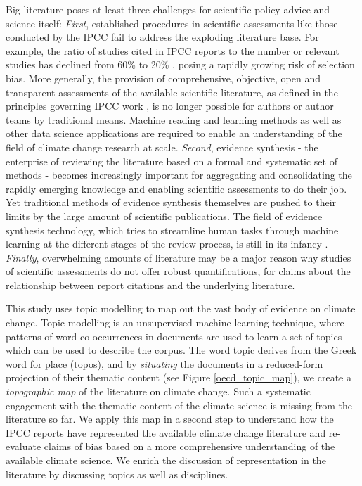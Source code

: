 \documentclass{article}
\begin{document}
\begin{linenumbers}
		Big literature poses at least three challenges for scientific policy advice and science itself: \emph{First}, established procedures in scientific assessments like those conducted by the IPCC fail to address the exploding literature base. For example, the ratio of studies cited in IPCC reports to the number or relevant studies has declined from 60\% to 20\%  \cite{Minx2017l}, posing a rapidly growing risk of selection bias. More generally, the provision of comprehensive, objective, open and transparent assessments of the available scientific literature, as defined in the principles governing IPCC work \cite{IPCC2013}, is no longer possible for authors or author teams by traditional means. 
		Machine reading and learning methods as well as other data science applications are required to enable an understanding of the field of climate change research at scale. 
		\emph{Second}, evidence synthesis - the enterprise of reviewing the literature based on a formal and systematic set of methods \cite{Chalmers2002} - becomes increasingly important for aggregating and consolidating the rapidly emerging knowledge and enabling scientific assessments to do their job. 
		Yet traditional methods of evidence synthesis themselves are pushed to their limits by the large amount of scientific publications. The field of evidence synthesis technology, which tries to streamline human tasks through machine learning at the different stages of the review process, is still in its infancy \cite{Beller2018}. \emph{Finally}, overwhelming amounts of literature may be a major reason why studies of scientific assessments \cite{Bjurström2011, Hulme2010, Victor2015} do not offer robust quantifications, for claims about the relationship between report citations and the underlying literature. 
		
		This study uses topic modelling \cite{Blei2010} to map out the vast body of evidence on climate change. Topic modelling is an unsupervised machine-learning technique, where patterns of word co-occurrences in documents are used to learn a set of topics which can be used to describe the corpus. The word topic derives from the Greek word for place (topos), and by \textit{situating} the documents in a reduced-form projection of their thematic content (see Figure \ref{oecd_topic_map}), we create a \textit{topographic map} of the literature on climate change. Such a systematic engagement with the thematic content of the climate science is missing from the literature so far. 
		We apply this map in a second step to understand how the IPCC reports have represented the available climate change literature and re-evaluate claims of bias based on a more comprehensive understanding of the available climate science. We enrich the discussion of representation in the literature by discussing topics as well as disciplines. 
		

\end{linenumbers}
\end{document}
